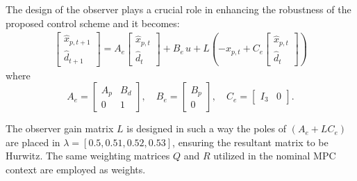 \documentclass[a4paper,12pt,oneside]{book}
\begin{document}
\bigskip
The design of the observer plays a crucial role in enhancing the robustness of the proposed control scheme and it becomes:
\begin{equation}
    \begin{aligned}
    	\begin{bmatrix}
    	   \hat{x}_{p,t+1} \\
            \hat{d}_{t+1}
        \end{bmatrix}
	= A_e 
        \begin{bmatrix}
        \hat{x}_{p,t} \\
        \hat{d}_t
    	\end{bmatrix}
        + 
        B_e \, u +
        L (
         - x_{p,t} +
        C_e
        \begin{bmatrix}
            \hat{x}_{p,t} \\
            \hat{d}_t
        \end{bmatrix} )
    \end{aligned}
\end{equation}
where
\begin{equation}
    A_e =
    \begin{bmatrix}
        A_p & B_d \\
        0 & 1  
    \end{bmatrix},
    \quad
    B_e = 
    \begin{bmatrix}
        B_p \\
        0  
    \end{bmatrix},
    \quad
    C_e = 
    \begin{bmatrix}
        I_3 & 0 
    \end{bmatrix}.
\label{Observer_real}
\end{equation}

\bigskip
The observer gain matrix $L$ is designed in such a way the poles of $(A_e + L C_e)$ are placed in $\lambda=[0.5, 0.51, 0.52, 0.53]$, ensuring the resultant matrix to be Hurwitz. 
The same weighting matrices $Q$ and $R$ utilized in the nominal MPC context are employed as weights.
\end{document}
